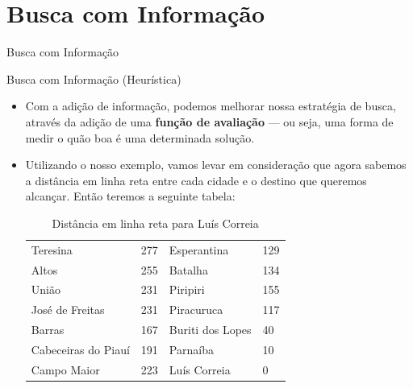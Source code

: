 \documentclass{libs/ufc_format}
\begin{document}
\section{Busca com Informação}

\begin{frame}{}
    \centering
    \Large
    Busca com Informação
\end{frame}

\begin{frame}{Busca com Informação (Heurística)}
    \begin{itemize}
        \justifying
        \item Com a adição de informação, podemos melhorar nossa estratégia de busca, através da adição de uma \textbf{função de avaliação} --- ou seja, uma forma de medir o quão boa é uma determinada solução.
        \item<2> Utilizando o nosso exemplo, vamos levar em consideração que agora sabemos a distância \alert{em linha reta} entre cada cidade e o destino que queremos alcançar. Então teremos a seguinte tabela:\\
        \begin{table}[]
            \centering
            \begin{tabular}{|l|l||l|l|}
            \hline
                Teresina & 277              &   Esperantina & 129 \\
                Altos & 255                 &   Batalha & 134 \\
                União & 231                 &   Piripiri & 155 \\
                José de Freitas & 231       &   Piracuruca & 117 \\
                Barras & 167                &   Buriti dos Lopes & 40 \\
                Cabeceiras do Piauí & 191   &   Parnaíba & 10 \\
                Campo Maior & 223           &   Luís Correia & 0\\
                \hline
            \end{tabular}
            \caption{Distância em linha reta para Luís Correia}
            \label{tab:my_label}
        \end{table}
    \end{itemize}
\end{frame}
\end{document}
